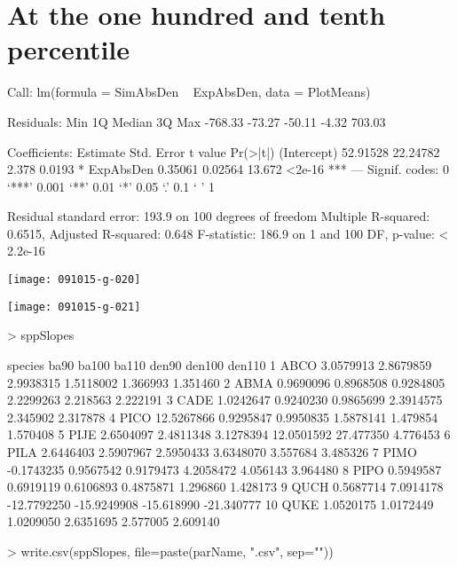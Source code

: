 \documentclass{article}
\begin{document}
\section{At the one hundred and tenth percentile}
\begin{Schunk}
\begin{Soutput}
Call:
lm(formula = SimAbsDen ~ ExpAbsDen, data = PlotMeans)

Residuals:
    Min      1Q  Median      3Q     Max 
-768.33  -73.27  -50.11   -4.32  703.03 

Coefficients:
            Estimate Std. Error t value Pr(>|t|)    
(Intercept) 52.91528   22.24782   2.378   0.0193 *  
ExpAbsDen    0.35061    0.02564  13.672   <2e-16 ***
---
Signif. codes:  0 ‘***’ 0.001 ‘**’ 0.01 ‘*’ 0.05 ‘.’ 0.1 ‘ ’ 1

Residual standard error: 193.9 on 100 degrees of freedom
Multiple R-squared:  0.6515,	Adjusted R-squared:  0.648 
F-statistic: 186.9 on 1 and 100 DF,  p-value: < 2.2e-16
\end{Soutput}
\end{Schunk}
\texttt{[image: 091015-g-020]}

\texttt{[image: 091015-g-021]}
\begin{Schunk}
\begin{Sinput}
>   sppSlopes
\end{Sinput}
\begin{Soutput}
   species       ba90     ba100       ba110       den90     den100     den110
1     ABCO  3.0579913 2.8679859   2.9938315   1.5118002   1.366993   1.351460
2     ABMA  0.9690096 0.8968508   0.9284805   2.2299263   2.218563   2.222191
3     CADE  1.0242647 0.9240230   0.9865699   2.3914575   2.345902   2.317878
4     PICO 12.5267866 0.9295847   0.9950835   1.5878141   1.479854   1.570408
5     PIJE  2.6504097 2.4811348   3.1278394  12.0501592  27.477350   4.776453
6     PILA  2.6446403 2.5907967   2.5950433   3.6348070   3.557684   3.485326
7     PIMO -0.1743235 0.9567542   0.9179473   4.2058472   4.056143   3.964480
8     PIPO  0.5949587 0.6919119   0.6106893   0.4875871   1.296860   1.428173
9     QUCH  0.5687714 7.0914178 -12.7792250 -15.9249908 -15.618990 -21.340777
10    QUKE  1.0520175 1.0172449   1.0209050   2.6351695   2.577005   2.609140
\end{Soutput}
\begin{Sinput}
>   write.csv(sppSlopes, file=paste(parName, ".csv", sep=""))
\end{Sinput}
\end{Schunk}
\end{document}
